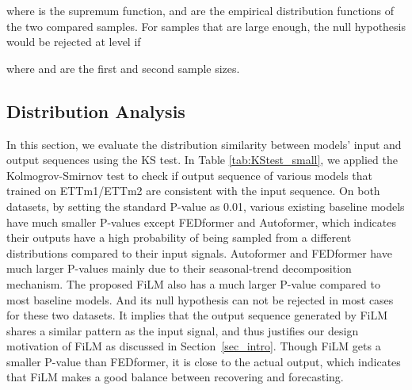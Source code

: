\documentclass{article}
\begin{document}
where  is the supremum function,  and  are the empirical distribution functions of the two compared samples.
For samples that are large enough, the null hypothesis would be rejected at level  if

where  and  are the first and second sample sizes.
\subsection{Distribution Analysis}
In this section, we evaluate the distribution similarity between models' input and output sequences using the KS test. In Table \ref{tab:KStest_small}, we applied the Kolmogrov-Smirnov test to check if output sequence of various models that trained on ETTm1/ETTm2 are consistent with the input sequence. 
On both datasets, by setting the standard P-value as 0.01, various existing baseline models have much smaller P-values except FEDformer and Autoformer, which indicates their outputs have a high probability of being sampled from a different distributions compared to their input signals. Autoformer and FEDformer have much larger P-values mainly due to their seasonal-trend decomposition mechanism. The proposed FiLM also has a much larger P-value compared to most baseline models. And its null hypothesis can not be rejected in most cases for these two datasets. It implies that the output sequence generated by FiLM shares a similar pattern as the input signal, and thus justifies our design motivation of FiLM as discussed in Section~\ref{sec_intro}. Though FiLM gets a smaller P-value than FEDformer, it is close to the actual output, which indicates that FiLM makes a good balance between recovering and forecasting. 
\end{document}
